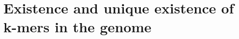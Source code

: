 \documentclass[11pt]{article}
\begin{document}
%

\section{Existence and unique existence of k-mers in the genome}\label{existence}
\end{document}
